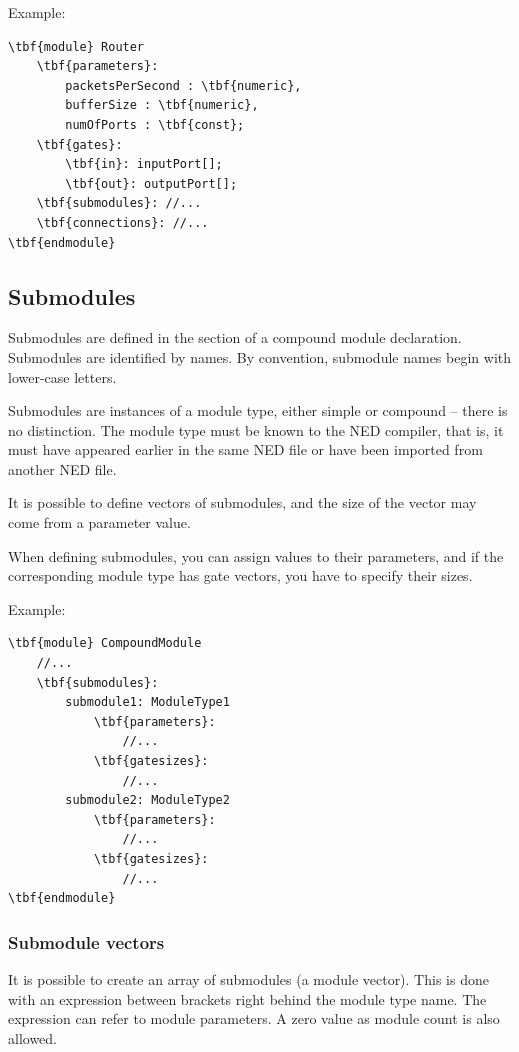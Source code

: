 Example:

\begin{Verbatim}[commandchars=\\\{\}]
\tbf{module} Router
    \tbf{parameters}:
        packetsPerSecond : \tbf{numeric},
        bufferSize : \tbf{numeric},
        numOfPorts : \tbf{const};
    \tbf{gates}:
        \tbf{in}: inputPort[];
        \tbf{out}: outputPort[];
    \tbf{submodules}: //...
    \tbf{connections}: //...
\tbf{endmodule}
\end{Verbatim}


\subsection{Submodules}

Submodules are defined in the
 section of a compound
module declaration. Submodules are identified by names.
By convention, submodule names begin with lower-case letters.

Submodules are instances of a module type, either simple
or compound -- there is no distinction. The module type
must be known to the NED compiler, that is, it must have appeared
earlier in the same NED file or have been imported from another
NED file.

It is possible to define vectors of submodules, and the
size of the vector may come from a parameter value.

When defining submodules, you can assign values to their
parameters, and if the corresponding module type has gate vectors,
you have to specify their sizes.


Example:

\begin{Verbatim}[commandchars=\\\{\}]
\tbf{module} CompoundModule
    //...
    \tbf{submodules}:
        submodule1: ModuleType1
            \tbf{parameters}:
                //...
            \tbf{gatesizes}:
                //...
        submodule2: ModuleType2
            \tbf{parameters}:
                //...
            \tbf{gatesizes}:
                //...
\tbf{endmodule}
\end{Verbatim}


\subsubsection{Submodule vectors}


It is possible to create an array of
submodules (a module
vector).  This is done with an expression between
brackets right behind the module type name. The expression can refer
to module parameters. A zero value as module count is also allowed.

